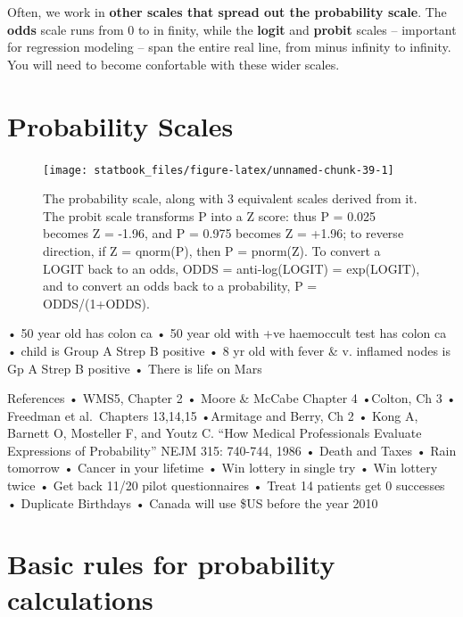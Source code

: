 \documentclass[]{book}
\begin{document}
Often, we work in \textbf{other scales that spread out the probability scale}. The \textbf{odds} scale runs from 0 to in finity, while the \textbf{logit} and \textbf{probit} scales -- important for regression modeling -- span the entire real line, from minus infinity to infinity. You will need to become confortable with these wider scales.

\hypertarget{probability-scales}{%
\section{Probability Scales}\label{probability-scales}}

\begin{figure}

{\centering \texttt{[image: statbook\_files/figure-latex/unnamed-chunk-39-1]} 

}

\caption{The probability scale, along with 3 equivalent scales derived from it. The probit scale transforms P into a Z score: thus P = 0.025 becomes Z = -1.96, and P = 0.975 becomes Z = +1.96; to reverse direction, if Z = qnorm(P), then P = pnorm(Z). To convert a LOGIT back to an odds, ODDS = anti-log(LOGIT) = exp(LOGIT), and to convert an odds back to a probability,  P = ODDS/(1+ODDS).}\label{fig:unnamed-chunk-39}
\end{figure}

• 50 year old has colon ca
• 50 year old with +ve haemoccult test has colon ca
• child is Group A Strep B positive
• 8 yr old with fever \& v. inflamed nodes is Gp A Strep B positive • There is life on Mars

References
• WMS5, Chapter 2 • Moore \& McCabe Chapter 4 •Colton, Ch 3
• Freedman et al.~Chapters 13,14,15 •Armitage and Berry, Ch 2
• Kong A, Barnett O, Mosteller F, and Youtz C. ``How Medical Professionals Evaluate Expressions of Probability'' NEJM 315: 740-744, 1986
• Death and Taxes • Rain tomorrow • Cancer in your lifetime • Win lottery in single try • Win lottery twice • Get back 11/20 pilot questionnaires • Treat 14 patients get 0 successes • Duplicate Birthdays • Canada will use \$US before the year 2010

\hypertarget{basic-rules-for-probability-calculations}{%
\section{Basic rules for probability calculations}\label{basic-rules-for-probability-calculations}}
\end{document}
